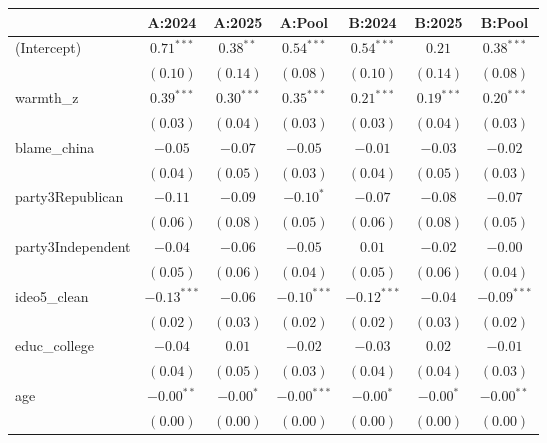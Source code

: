 
\begin{tabular}{l c c c c c c}
\toprule
 & A:2024 & A:2025 & A:Pool & B:2024 & B:2025 & B:Pool \\
\midrule
(Intercept)            & $0.71^{***}$  & $0.38^{**}$  & $0.54^{***}$  & $0.54^{***}$  & $0.21$       & $0.38^{***}$  \\
                       & $(0.10)$      & $(0.14)$     & $(0.08)$      & $(0.10)$      & $(0.14)$     & $(0.08)$      \\
warmth\_z              & $0.39^{***}$  & $0.30^{***}$ & $0.35^{***}$  & $0.21^{***}$  & $0.19^{***}$ & $0.20^{***}$  \\
                       & $(0.03)$      & $(0.04)$     & $(0.03)$      & $(0.03)$      & $(0.04)$     & $(0.03)$      \\
blame\_china           & $-0.05$       & $-0.07$      & $-0.05$       & $-0.01$       & $-0.03$      & $-0.02$       \\
                       & $(0.04)$      & $(0.05)$     & $(0.03)$      & $(0.04)$      & $(0.05)$     & $(0.03)$      \\
party3Republican       & $-0.11$       & $-0.09$      & $-0.10^{*}$   & $-0.07$       & $-0.08$      & $-0.07$       \\
                       & $(0.06)$      & $(0.08)$     & $(0.05)$      & $(0.06)$      & $(0.08)$     & $(0.05)$      \\
party3Independent      & $-0.04$       & $-0.06$      & $-0.05$       & $0.01$        & $-0.02$      & $-0.00$       \\
                       & $(0.05)$      & $(0.06)$     & $(0.04)$      & $(0.05)$      & $(0.06)$     & $(0.04)$      \\
ideo5\_clean           & $-0.13^{***}$ & $-0.06$      & $-0.10^{***}$ & $-0.12^{***}$ & $-0.04$      & $-0.09^{***}$ \\
                       & $(0.02)$      & $(0.03)$     & $(0.02)$      & $(0.02)$      & $(0.03)$     & $(0.02)$      \\
educ\_college          & $-0.04$       & $0.01$       & $-0.02$       & $-0.03$       & $0.02$       & $-0.01$       \\
                       & $(0.04)$      & $(0.05)$     & $(0.03)$      & $(0.04)$      & $(0.04)$     & $(0.03)$      \\
age                    & $-0.00^{**}$  & $-0.00^{*}$  & $-0.00^{***}$ & $-0.00^{*}$   & $-0.00^{*}$  & $-0.00^{**}$  \\
                       & $(0.00)$      & $(0.00)$     & $(0.00)$      & $(0.00)$      & $(0.00)$     & $(0.00)$      \\

\end{tabular}
